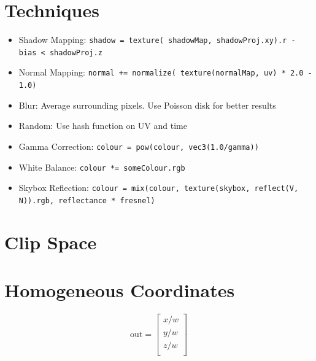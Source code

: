 \documentclass{article}
\begin{document}
\begin{landscape}
\begin{multicols}{3}
            \section{Techniques}
            \begin{itemize}
                \item \RaggedRight Shadow Mapping: \texttt{shadow = texture( shadowMap, shadowProj.xy).r - bias < shadowProj.z }
                \item Normal Mapping: \texttt{normal += normalize( texture(normalMap, uv) * 2.0 - 1.0)}
                \item Blur: Average surrounding pixels. Use Poisson disk for better results
                \item Random: Use hash function on UV and time
                \item Gamma Correction: \texttt{colour = pow(colour, vec3(1.0/gamma))}
                \item White Balance: \texttt{colour *= someColour.rgb}
                \item Skybox Reflection: \texttt{colour = mix(colour, texture(skybox, reflect(V, N)).rgb, reflectance * fresnel)}
            \end{itemize}

            \section{Clip Space}
            \section{Homogeneous Coordinates}
            $$
            \text{out}
            =
            \begin{bmatrix}
                x/w \\
                y/w \\
                z/w \\
            \end{bmatrix}
            $$

\end{multicols}
\end{landscape}
\end{document}
